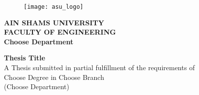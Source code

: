 \thispagestyle{empty} %

\begin{center}
\begin{figure}
  \begin{center}
    \texttt{[image: asu\_logo]}
  \end{center}
\end{figure}
\small
\textbf{AIN SHAMS UNIVERSITY\\
	FACULTY OF ENGINEERING\\
	Choose Department}



\vfill
\Large
\textbf{Thesis Title} \\ 

\vfill
\small
A Thesis submitted in partial fulfillment of the requirements of \\ 
 Choose Degree in Choose Branch  \\
(Choose Department)\\









\end{center}
